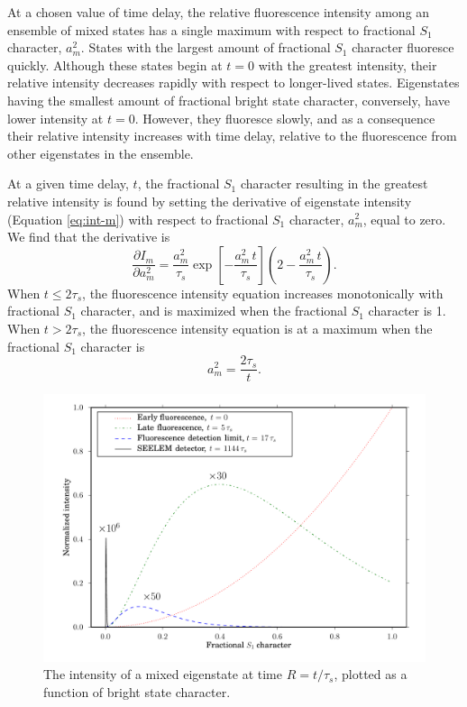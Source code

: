 At a chosen value of time delay, the relative fluorescence intensity
among an ensemble of mixed states has a single maximum with respect to
fractional $S_1$ character, $a_m^2$.  States with the largest amount
of fractional $S_1$ character fluoresce quickly.  Although these
states begin at $t=0$ with the greatest intensity, their relative
intensity decreases rapidly with respect to longer-lived states.
Eigenstates having the smallest amount of fractional bright state
character, conversely, have lower intensity at $t=0$.  However, they
fluoresce slowly, and as a consequence their relative intensity
increases with time delay, relative to the fluorescence from other
eigenstates in the ensemble.

At a given time delay, $t$, the fractional $S_1$ character resulting
in the greatest relative intensity is found by setting the derivative
of eigenstate intensity (Equation \ref{eq:int-m}) with respect to
fractional $S_1$ character, $a_m^2$, equal to zero.  We find that the
derivative is
\begin{equation}
 \frac{ \partial I_m }{ \partial a_m^2 } =
   \frac{a_m^2}{\tau_s}
   \exp \left[
     -\frac{a_m^2 \, t}{\tau_s} 
   \right]
   \left (
     2 - \frac{a_m^2 \, t}{\tau_s}
   \right ).
\end{equation}
When $t \leq 2\tau_s$, the fluorescence intensity equation increases
monotonically with fractional $S_1$ character, and is maximized
when the fractional $S_1$ character is 1.  When $t > 2 \tau_s$,
the fluorescence intensity equation is at a maximum when the
fractional $S_1$ character is
\begin{equation}
  \label{eq:am-max}
  a_m^2 = \frac{2 \tau_s}{t}.
\end{equation}

\begin{figure}
  \caption{The intensity of a mixed eigenstate at time $R = t/\tau_s$,
    plotted as a function of bright state character.}
  \label{fig:int-at-rc}
  \centering
  \includegraphics[width=7.5in,angle=90]{intensity-at-delay.pdf}
\end{figure}

